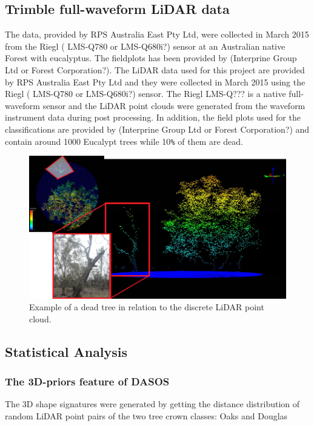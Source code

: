 \documentclass{subfiles}
\begin{document}
\subsection{Trimble full-waveform LiDAR data}

\par The data, provided by RPS Australia East Pty Ltd, were collected in March 2015 from the Riegl ( LMS-Q780 or LMS-Q680i?) sensor at an Australian native Forest with eucalyptus. The fieldplots has been provided by (Interprine Group Ltd or Forest Corporation?). 
The LiDAR data used for this project are provided by RPS Australia East Pty Ltd and they were collected in March 2015 using the Riegl ( LMS-Q780 or LMS-Q680i?) sensor. The Riegl LMS-Q??? is a native full-waveform sensor and the LiDAR point clouds were generated from the waveform instrument data during post processing. In addition, the field plots used for the classifications are provided by (Interprine Group Ltd or Forest Corporation?) and contain around 1000 Eucalypt trees while 10\verb|%| of them are dead. 
\begin{figure} [h!]
	\centering
	\includegraphics[width=\textwidth]{img/DeadTreeInLiDAR}
	\caption{Example of a dead tree in relation to the discrete LiDAR point cloud.}
	\label{fig:DeadTreeInLiDAR}
\end{figure}

\subsection{Statistical Analysis}
\subsubsection{The 3D-priors feature of DASOS}
The 3D shape signatures were generated by getting the distance distribution of random LiDAR point pairs of the two tree crown classes: Oaks and Douglas \cite{Dong2009}
\end{document}
